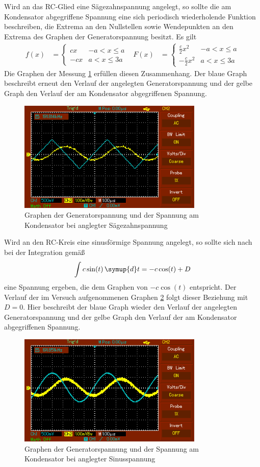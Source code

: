 Wird an das RC-Glied eine Sägezahnspannung angelegt, so sollte die am Kondensator
abgegriffene Spannung eine sich periodisch wiederholende Funktion beschreiben, die
Extrema an den Nullstellen sowie Wendepunkten an den Extrema des Graphen der
Generatorspannung besitzt. Es gilt
\begin{align}
  f(x)&=
  \begin{cases}
    c x & -a<x\leq a\\
    -c x & a<x\leq 3a
  \end{cases}
  & F(x)&=
  \begin{cases}
    \frac{c}{2} x^2 & -a<x\leq a\\
    -\frac{c}{2} x^2 & a<x\leq 3a
  \end{cases}
\end{align}
Die Graphen der Messung \ref{fig:saegezahn} erfüllen diesen Zusammenhang.
Der blaue Graph beschreibt erneut den Verlauf der angelegten Generatorspannung und
der gelbe Graph den Verlauf der am Kondensator abgegriffenen Spannung.
\begin{figure}
  \centering
  \includegraphics[width=250pt]{data/integration_saegezahn.PNG}
  \caption{Graphen der Generatorspannung und der Spannung am Kondensator bei anglegter
  Sägezahnspannung}
  \label{fig:saegezahn}
\end{figure}


Wird an den RC-Kreis eine sinusförmige Spannung angelegt, so sollte sich nach bei der
Integration gemäß
\begin{equation}
  \int c\sin(t) \, \symup{d}t=-c\cos(t) + D
\end{equation}
eine Spannung ergeben, die dem Graphen von $-c\cos(t)$ entspricht. Der Verlauf der
im Versuch aufgenommenen Graphen \ref{fig:sinus} folgt dieser Beziehung mit $D = 0$. Hier beschreibt der blaue Graph
wieder den Verlauf der angelegten Generatorspannung und der gelbe Graph den Verlauf der
am Kondensator abgegriffenen Spannung.
\begin{figure}
  \centering
  \includegraphics[width=250pt]{data/integration_sinus.PNG}
  \caption{Graphen der Generatorspannung und der Spannung am Kondensator bei anglegter
  Sinusspannung}
  \label{fig:sinus}
\end{figure}
